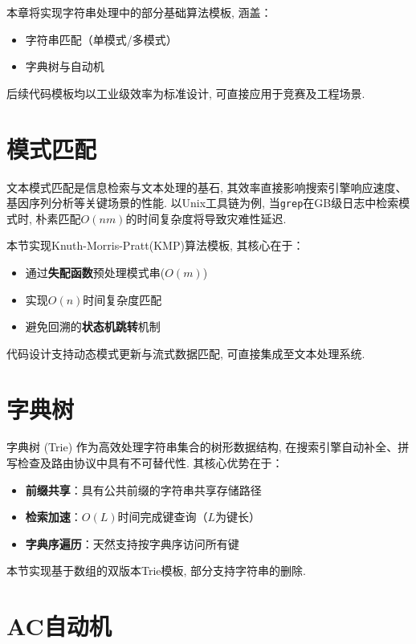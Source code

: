 \documentclass[a4paper]{ctexbook}
\begin{document}
本章将实现字符串处理中的部分基础算法模板, 涵盖：
\begin{itemize}
	\item 字符串匹配（单模式/多模式）
	\item 字典树与自动机
\end{itemize}

后续代码模板均以工业级效率为标准设计, 可直接应用于竞赛及工程场景.

\section{模式匹配}

文本模式匹配是信息检索与文本处理的基石, 其效率直接影响搜索引擎响应速度、基因序列分析等关键场景的性能. 以Unix工具链为例, 当\texttt{grep}在GB级日志中检索模式时, 朴素匹配$O(nm)$的时间复杂度将导致灾难性延迟.

本节实现Knuth-Morris-Pratt(KMP)算法模板, 其核心在于：
\begin{itemize}
	\item 通过\textbf{失配函数}预处理模式串($O(m)$)
	\item 实现$O(n)$时间复杂度匹配
	\item 避免回溯的\textbf{状态机跳转}机制
\end{itemize}
代码设计支持动态模式更新与流式数据匹配, 可直接集成至文本处理系统.



\section{字典树}

字典树 (Trie) 作为高效处理字符串集合的树形数据结构, 在搜索引擎自动补全、拼写检查及路由协议中具有不可替代性. 其核心优势在于：
\begin{itemize}
	\item \textbf{前缀共享}：具有公共前缀的字符串共享存储路径
	\item \textbf{检索加速}：$O(L)$时间完成键查询（$L$为键长）
	\item \textbf{字典序遍历}：天然支持按字典序访问所有键
\end{itemize}

本节实现基于数组的双版本Trie模板, 部分支持字符串的删除.



\section{AC自动机}
\end{document}

